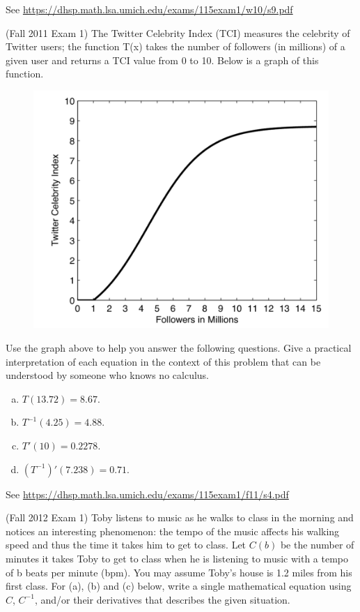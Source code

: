 \documentclass[11pt]{exam}
\begin{document}
\begin{questions}
\begin{enumerate}[(a)]
\end{enumerate}
\begin{solution}
 See \href{https://dhsp.math.lsa.umich.edu/exams/115exam1/w10/s9.pdf}{https://dhsp.math.lsa.umich.edu/exams/115exam1/w10/s9.pdf}
\end{solution}
\question (Fall 2011 Exam 1) The Twitter Celebrity Index (TCI) measures the celebrity of Twitter users; the function T(x) takes the number of followers (in millions) of a given user and returns a TCI value from 0 to 10. Below is a graph of this function.
	\begin{figure}[h]
		\includegraphics[scale=0.4]{Twitter.png}
	\end{figure}
Use the graph above to help you answer the following questions. Give a practical interpretation of each equation in the context of this problem that can be understood by someone who knows no calculus.
\begin{multicols}{2}
\begin{enumerate}[(a)]
	\item $T(13.72) = 8.67$.
	\item $T^{-1}(4.25) = 4.88$.
	\item $T'(10) = 0.2278$.
	\item $(T^{-1})'(7.238) = 0.71$.
\end{enumerate}
\end{multicols}
\begin{solution}
 See \href{https://dhsp.math.lsa.umich.edu/exams/115exam1/f11/s4.pdf}{https://dhsp.math.lsa.umich.edu/exams/115exam1/f11/s4.pdf}
\end{solution}
\question (Fall 2012 Exam 1) Toby listens to music as he walks to class in the morning and notices an interesting phenomenon: the tempo of the music affects his walking speed and thus the time it takes him to get to class. Let $C(b)$ be the number of minutes it takes Toby to get to class when he is listening to music with a tempo of b beats per minute (bpm). You may assume Toby's house is 1.2 miles from his first class.
	For (a), (b) and (c) below, write a single mathematical equation using $C$, $C^{-1}$, and/or their derivatives that describes the given situation.


\end{questions}
\end{document}
